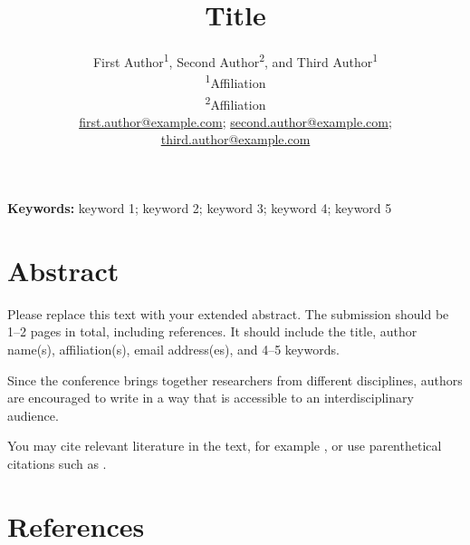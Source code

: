 \documentclass[11pt,a4paper]{article}
\title{Title}
\author{
First Author\textsuperscript{1}, Second Author\textsuperscript{2}, and Third Author\textsuperscript{1}\\[0.4em]
\small \textsuperscript{1}Affiliation\\
\small \textsuperscript{2}Affiliation\\[0.4em]
\small \href{mailto:first.author@example.com}{first.author@example.com};
\href{mailto:second.author@example.com}{second.author@example.com};
\href{mailto:third.author@example.com}{third.author@example.com}
}
\date{}
\begin{document}
\maketitle

\noindent\textbf{Keywords:} keyword 1; keyword 2; keyword 3; keyword 4; keyword 5

\vspace{0.8em}


\section*{Abstract}

Please replace this text with your extended abstract. The submission should be 1--2 pages in total, including references. It should include the title, author name(s), affiliation(s), email address(es), and 4--5 keywords.

Since the conference brings together researchers from different disciplines, authors are encouraged to write in a way that is accessible to an interdisciplinary audience.

You may cite relevant literature in the text, for example \textcite{example2024}, or use parenthetical citations such as \parencite{example2024}.


\section*{References}

\printbibliography[heading=none]
\end{document}

